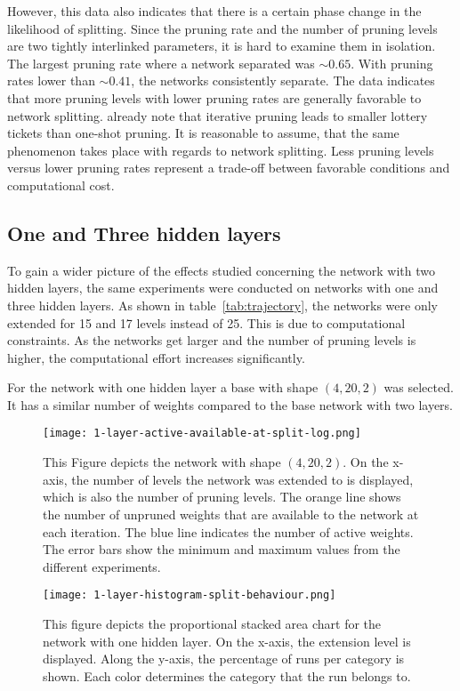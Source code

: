 However, this data also indicates that there is a certain phase change in the likelihood of splitting.
Since the pruning rate and the number of pruning levels are two tightly interlinked parameters, it is hard to examine them in isolation.
The largest pruning rate where a network separated was $\sim0.65$. 
With pruning rates lower than $\sim0.41$, the networks consistently separate.
The data indicates that more pruning levels with lower pruning rates are generally favorable to network splitting.
\textcite{LTH} already note that iterative pruning leads to smaller lottery tickets than one-shot pruning.
It is reasonable to assume, that the same phenomenon takes place with regards to network splitting.
Less pruning levels versus lower pruning rates represent a trade-off between favorable conditions and computational cost.

\subsection{One and Three hidden layers}
To gain a wider picture of the effects studied concerning the network with two hidden layers, the same experiments were conducted on networks with one and three hidden layers.
As shown in table~\ref{tab:trajectory}, the networks were only extended for 15 and 17 levels instead of 25. 
This is due to computational constraints. As the networks get larger and the number of pruning levels is higher, the computational effort increases significantly.

For the network with one hidden layer a base with shape $(4,20,2)$ was selected.
It has a similar number of weights compared to the base network with two layers.

\begin{figure}[ht]
    \centering
    \texttt{[image: 1-layer-active-available-at-split-log.png]}
    \caption{This Figure depicts the network with shape $(4,20,2)$.
    On the x-axis, the number of levels the network was extended to is displayed, which is also the number of pruning levels.
    The orange line shows the number of unpruned weights that are available to the network at each iteration.
    The blue line indicates the number of active weights.
    The error bars show the minimum and maximum values from the different experiments.
    }\label{fig:1layer-active}
\end{figure}

\begin{figure}[ht]
    \centering
    \texttt{[image: 1-layer-histogram-split-behaviour.png]}
    \caption{
        This figure depicts the proportional stacked area chart for the network with one hidden layer.
        On the x-axis, the extension level is displayed. 
        Along the y-axis, the percentage of runs per category is shown.
        Each color determines the category that the run belongs to.
    }\label{fig:1layer-histogram}
\end{figure}


